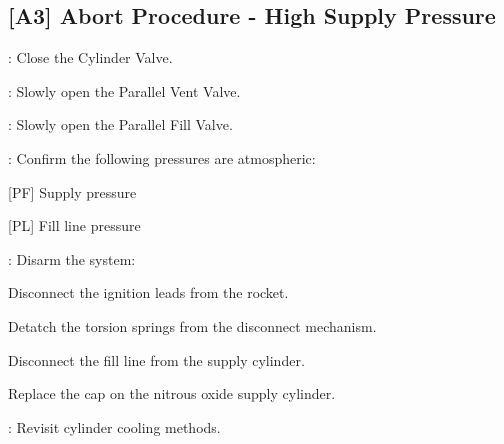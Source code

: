 \begin{checklist}
\subsection{[A3] Abort Procedure - High Supply Pressure}
\begin{checklist}
    \item \primary{}: Close the Cylinder Valve.
    \item \primary{}: Slowly open the Parallel Vent Valve.
    \item \primary{}: Slowly open the Parallel Fill Valve.
    \item \control{}: Confirm the following pressures are atmospheric:
    \begin{checklist}
        \item {[PF]} Supply pressure
        \item {[PL]} Fill line pressure
    \end{checklist}
    \item \primary{}: Disarm the system:
        \begin{checklist}    
            \item Disconnect the ignition leads from the rocket.
            \item Detatch the torsion springs from the disconnect mechanism.
            \item Disconnect the fill line from the supply cylinder.
            \item Replace the cap on the nitrous oxide supply cylinder.
        \end{checklist}
    \item \ops{}: Revisit cylinder cooling methods.
\end{checklist}
\setcounter{checklistnum}{0}


\end{checklist}

